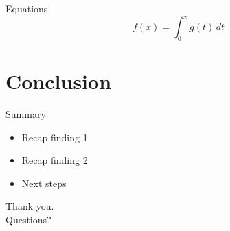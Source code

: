 \documentclass[aspectratio=169]{beamer}
\begin{document}
\begin{frame}{Equations}
  \[
    f(x) = \int_{0}^{x} g(t) \, dt
  \]
\end{frame}

\section{Conclusion}

\begin{frame}{Summary}
  \begin{itemize}
    \item Recap finding 1
    \item Recap finding 2
    \item Next steps
  \end{itemize}
\end{frame}

\begin{frame}
  \begin{center}
    \Huge Thank you. \\[1em]
    \large Questions?
  \end{center}
\end{frame}
\end{document}
